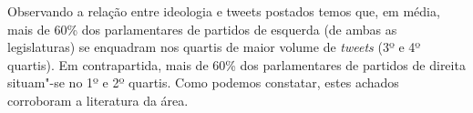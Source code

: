 

Observando a relação entre ideologia e tweets postados temos que, em
média, mais de 60\% dos parlamentares de partidos de esquerda (de ambas
as legislaturas) se enquadram nos quartis de maior volume de
\textit{tweets} (3º e 4º quartis). Em contrapartida, mais de 60\% dos
parlamentares de partidos de direita situam"-se no 1º e 2º quartis. Como
podemos constatar, estes achados corroboram a literatura da área.

